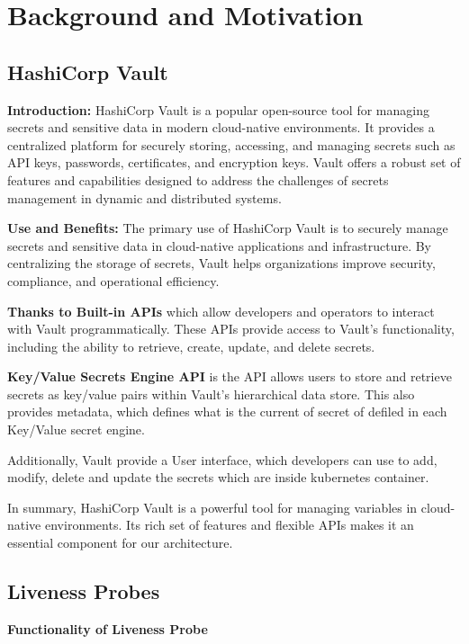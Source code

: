 \section{Background and Motivation}

\subsection{HashiCorp Vault}

\textbf{Introduction:}
HashiCorp Vault is a popular open-source tool for managing secrets and sensitive data in modern cloud-native environments. It provides a centralized platform for securely storing, accessing, and managing secrets such as API keys, passwords, certificates, and encryption keys. Vault offers a robust set of features and capabilities designed to address the challenges of secrets management in dynamic and distributed systems. \cite{vault}

\textbf{Use and Benefits:}
The primary use of HashiCorp Vault is to securely manage secrets and sensitive data in cloud-native applications and infrastructure. By centralizing the storage of secrets, Vault helps organizations improve security, compliance, and operational efficiency.

\textbf{Thanks to Built-in APIs} which allow developers and operators to interact with Vault programmatically. These APIs provide access to Vault's functionality, including the ability to retrieve, create, update, and delete secrets.  \cite{vault-api}

\textbf{Key/Value Secrets Engine API} is the API allows users to store and retrieve secrets as key/value pairs within Vault's hierarchical data store. This also provides metadata, which defines what is the current of secret of defiled in each Key/Value secret engine. \cite{vault-kv}

Additionally, Vault provide a User interface, which developers can use to add, modify, delete and update the secrets which are inside kubernetes container. \cite{vault-ui}

In summary, HashiCorp Vault is a powerful tool for managing variables in cloud-native environments. Its rich set of features and flexible APIs makes it an essential component for our architecture.

\subsection{Liveness Probes}

\textbf{Functionality of Liveness Probe}

